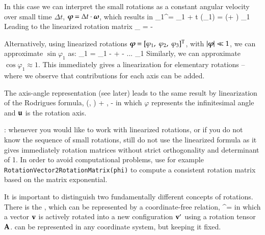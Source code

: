 {%

In this case we can interpret the small rotations as a constant angular velocity over small time $\Delta t$, $\mbox{\boldmath $\varphi$ \unboldmath}\!\! = \Delta t \cdot \mbox{\boldmath $\omega$ \unboldmath}\!\!$, which results in
\be
  \rv_1^\prime= \rv_1 + \Delta t \cdot (\tomega \times \rv_1) = (\Im + \tilde \tvarphi) \rv_1
\ee
Leading to the linearized rotation matrix
\be
  \Rot_ = \Im - \tilde \tvarphi
\ee

Alternatively, using linearized rotations $\mbox{\boldmath $\varphi$ \unboldmath}\!\! = [\varphi_1,\;\varphi_2,\;\varphi_3]^\mathrm{T}$, with $|\mbox{\boldmath $\varphi$ \unboldmath}\!\!| \ll 1$, we can approximate $\sin \varphi_1$ as:
\be
  \sin \varphi_1 = \varphi_1 -  +  - ... \approx \varphi_1
\ee
Similarly, we can approximate $\cos \varphi_1 \approx 1$. This immediately gives a linearization for elementary rotations -- where we observe that contributions for each axis can be added.

The axis-angle representation (see later) leads to the same result by linearization of the Rodrigues formula,
\be
  \Rot(\uv, \varphi) \approx \Im + \tilde \uv \varphi, \quad \Rot\tp \approx \Im - \tilde \uv \varphi
\ee
in which $\varphi$ represents the infinitesimal angle and $\mathbf{u}$ is the rotation axis.

: whenever you would like to work with linearized rotations, or if you do not know the sequence of small rotations, still do not use the linearized formula as it gives immediately rotation matrices without strict orthogonality and determinant of 1. In order to avoid computational problems, use for example \texttt{RotationVector2RotationMatrix(phi)} to compute a consistent rotation matrix based on the matrix exponential.


%
It is important to distinguish two fundamentally different concepts of rotations.
There is the , which can be represented by a coordinate-free relation,
\be \label{eq:theory:rotations:active}
  \vv^\prime = \Rot \vv
\ee
in which a vector $\mathbf{v}$ is actively rotated into a new configuration $\mathbf{v}^\prime$ using a rotation tensor $\mathbf{A}$.
 can be represented in any coordinate system, but keeping it fixed.

}
